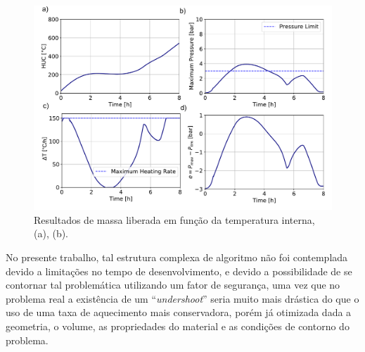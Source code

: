 \begin{figure}[H]
	\centering
	\includegraphics[width=14cm]{./figures/PID.pdf}
	\caption{Resultados de massa liberada em função da temperatura interna, (a),
    (b).
  \label{fig:PID}}
\end{figure}

No presente trabalho, tal estrutura complexa de algoritmo não foi contemplada
devido a limitações no tempo de desenvolvimento, e devido a possibilidade de se
contornar tal problemática utilizando um fator de segurança, uma vez que no
problema real a existência de um ``{\it undershoot}'' seria muito mais drástica
do que o uso de uma taxa de aquecimento mais conservadora, porém já otimizada
dada a geometria, o volume, as propriedades do material e as condições de
contorno do problema.

